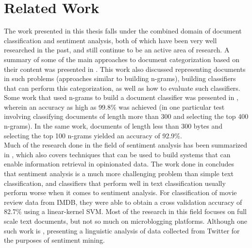\chapter{Related Work}
\label{chapter:Related Work}

The work presented in this thesis falls under the combined domain of document classification and sentiment analysis, both of which have been very well researched in the past, and still continue to be an active area of research. A summary of some of the main approaches to document categorization based on their content was presented in \cite{sebastiani2002machine}. This work also discussed representing documents in such problems (approaches similar to building n-grams), building classifiers that can perform this categorization, as well as how to evaluate such classifiers. Some work that used n-grams to build a document classifier was presented in \cite{cavnar1994n}, wherein an accuracy as high as 99.8\% was achieved (in one particular test involving classifying documents of length more than 300 and selecting the top 400 n-grams). In the same work, documents of length less than 300 bytes and selecting the top 100 n-grams yielded an accuracy of 92.9\%.\\

Much of the research done in the field of sentiment analysis has been summarized in \cite{pang2008opinion}, which also covers techniques that can be used to build systems that can enable information retrieval in opinionated data. The work done in \cite{pang2002thumbs} concludes that sentiment analysis is a much more challenging problem than simple text classification, and classifiers that perform well in text classification usually perform worse when it comes to sentiment analysis. For classification of movie review data from IMDB, they were able to obtain a cross validation accuracy of 82.7\% using a linear-kernel SVM. Most of the research in this field focuses on full scale text documents, but not so much on microblogging platforms. Although one such work is \cite{pak2010twitter}, presenting a linguistic analysis of data collected from Twitter for the purposes of sentiment mining.\\

